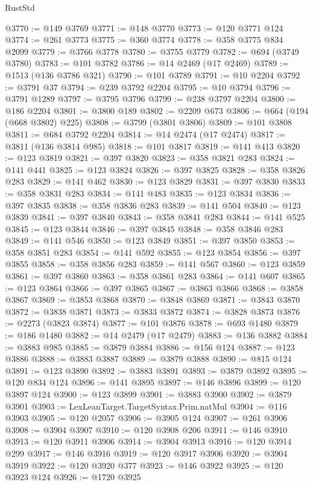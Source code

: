 \begin{lexlean}{RustStd}
\begin{coremodule}
@3770 := @149 @3769
@3771 := @148 @3770
@3773 := @120 @3771 @124
@3774 := @261 @3773
@3775 := @360 @3774
@3778 := @358 @3775 @834 @2099
@3779 := @3766 @3778
@3780 := @3755 @3779
@3782 := @694 (@3749 @3780)
@3783 := @101 @3782
@3786 := @14 @2469 (@17 @2469)
@3789 := @1513 (@136 @3786 @321)
@3790 := @101 @3789
@3791 := @10 @2204
@3792 := @3791 @37
@3794 := @239 @3792 @2204
@3795 := @10 @3794
@3796 := @3791 @1289
@3797 := @3795 @3796
@3799 := @238 @3797 @2204
@3800 := @186 @2204
@3801 := @3800 @189
@3802 := @2209 @673
@3806 := @664 (@194 (@668 @3802) @225)
@3808 := @3799 (@3801 @3806)
@3809 := @101 @3808
@3811 := @684 @3792 @2204
@3814 := @14 @2474 (@17 @2474)
@3817 := @3811 (@136 @3814 @985)
@3818 := @101 @3817
@3819 := @141 @413
@3820 := @123 @3819
@3821 := @397 @3820
@3823 := @358 @3821 @283
@3824 := @141 @441
@3825 := @123 @3824
@3826 := @397 @3825
@3828 := @358 @3826 @283
@3829 := @141 @462
@3830 := @123 @3829
@3831 := @397 @3830
@3833 := @358 @3831 @283
@3834 := @141 @483
@3835 := @123 @3834
@3836 := @397 @3835
@3838 := @358 @3836 @283
@3839 := @141 @504
@3840 := @123 @3839
@3841 := @397 @3840
@3843 := @358 @3841 @283
@3844 := @141 @525
@3845 := @123 @3844
@3846 := @397 @3845
@3848 := @358 @3846 @283
@3849 := @141 @546
@3850 := @123 @3849
@3851 := @397 @3850
@3853 := @358 @3851 @283
@3854 := @141 @592
@3855 := @123 @3854
@3856 := @397 @3855
@3858 := @358 @3856 @283
@3859 := @141 @567
@3860 := @123 @3859
@3861 := @397 @3860
@3863 := @358 @3861 @283
@3864 := @141 @607
@3865 := @123 @3864
@3866 := @397 @3865
@3867 := @3863 @3866
@3868 := @3858 @3867
@3869 := @3853 @3868
@3870 := @3848 @3869
@3871 := @3843 @3870
@3872 := @3838 @3871
@3873 := @3833 @3872
@3874 := @3828 @3873
@3876 := @2273 (@3823 @3874)
@3877 := @101 @3876
@3878 := @693 @1480
@3879 := @186 @1480
@3882 := @14 @2479 (@17 @2479)
@3883 := @136 @3882
@3884 := @3883 @985
@3885 := @3879 @3884
@3886 := @156 @124
@3887 := @123 @3886
@3888 := @3883 @3887
@3889 := @3879 @3888
@3890 := @815 @124
@3891 := @123 @3890
@3892 := @3883 @3891
@3893 := @3879 @3892
@3895 := @120 @834 @124
@3896 := @141 @3895
@3897 := @146 @3896
@3899 := @120 @3897 @124
@3900 := @123 @3899
@3901 := @3883 @3900
@3902 := @3879 @3901
@3903 := LexLeanTarget.TargetSyntax.Prim.natMul
@3904 := @116 @3903
@3905 := @120 @2057
@3906 := @3905 @124
@3907 := @261 @3906
@3908 := @3904 @3907
@3910 := @120 @3908 @206
@3911 := @146 @3910
@3913 := @120 @3911 @3906
@3914 := @3904 @3913
@3916 := @120 @3914 @299
@3917 := @146 @3916
@3919 := @120 @3917 @3906
@3920 := @3904 @3919
@3922 := @120 @3920 @377
@3923 := @146 @3922
@3925 := @120 @3923 @124
@3926 := @1720 @3925

\end{coremodule}
\end{lexlean}
